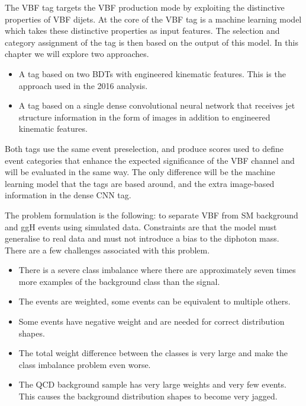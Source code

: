The VBF tag targets the VBF production mode by exploiting the distinctive properties of VBF dijets. 
At the core of the VBF tag is a machine learning model which takes these distinctive properties as input features. 
The selection and category assignment of the tag is then based on the output of this model.
In this chapter we will explore two approaches.
\begin{itemize}[noitemsep]
    \item A tag based on two BDTs with engineered kinematic features. This is the approach used in the 2016 \Hgg analysis. 
    \item A tag based on a single dense convolutional neural network that receives jet structure information in the form of images in addition to engineered kinematic features. 
\end{itemize}
Both tags use the same event preselection, and produce scores used to define event categories that enhance the expected significance of the VBF channel and will be evaluated in the same way. The only difference will be the machine learning model that the tags are based around, and the extra image-based information in the dense CNN tag.  

The problem formulation is the following: to separate VBF from SM background and ggH events using simulated data. 
Constraints are that the model must generalise to real data and must not introduce a bias to the diphoton mass. 
There are a few challenges associated with this problem.
\begin{itemize}[noitemsep]
    \item There is a severe class imbalance where there are approximately seven times more examples of the background class than the signal.
    \item The events are weighted, some events can be equivalent to multiple others.
    \item Some events have negative weight and are needed for correct distribution shapes.
    \item The total weight difference between the classes is very large and make the class imbalance problem even worse.
    \item The QCD background sample has very large weights and very few events. This causes the background distribution shapes to become very jagged. 
\end{itemize}



